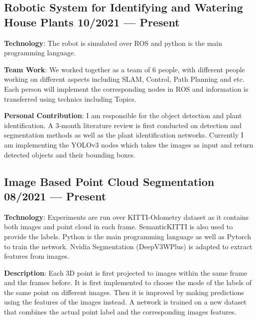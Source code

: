 
\subsection{{Robotic System for Identifying and Watering House Plants 
    \hfill 10/2021 --- Present}}
\vspace{0.3em}
\begin{zitemize}
    \item \textbf{Technology}: The robot is simulated over ROS and python is the main
        programming language. 
    \item \textbf{Team Work}: We worked together as a team of 6 people, with different
        people working on different aspects including SLAM, Control, 
        Path Planning and etc. Each person will implement the corresponding 
        nodes in ROS and information is transferred using technics including
        Topics.
    \item \textbf{Personal Contribution}: I am responsible for the object 
        detection and plant identification. 
        A 3-month literature review is first conducted on detection and 
        segmentation methods as well as the plant identification networks.
        Currently I am implementing the YOLOv3 nodes which takes the images
        as input and return detected objects and their bounding boxes.
\end{zitemize}

\subsection{{Image Based Point Cloud Segmentation 
    \hfill 08/2021 --- Present}}
\vspace{0.3em}
\begin{zitemize}
    \item \textbf{Technology}: Experiments are run over KITTI-Odometry dataset 
        as it contains both images and point cloud in each frame.
        SemanticKITTI is also used to provide the labels.
        Python is the main programming language as well as Pytorch to train
        the network.
        Nvidia Segmentation (DeepV3WPlus) is adapted to extract features from 
        images.
    \item \textbf{Description}: Each 3D point is first projected to images within
        the same frame and the frames before. 
        It is first implemented to choose the mode of the labels of the same point
        on different images. 
        Then it is improved by making predictions using the features of the images
        instead.
        A network is trained on a new dataset that combines the actual point
        label and the corresponding images features. 
\end{zitemize}
